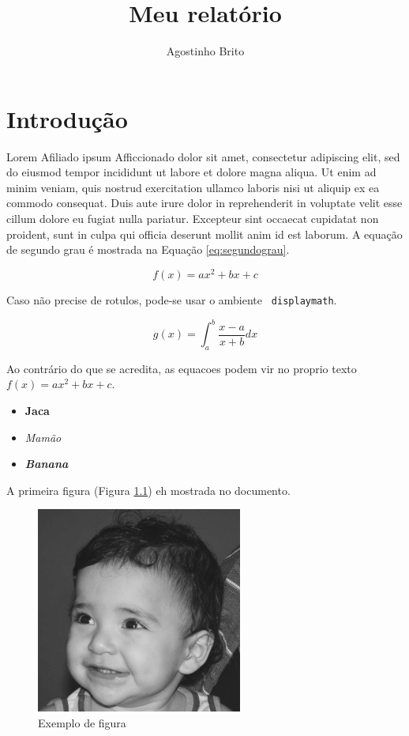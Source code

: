 \documentclass[a4, 12pt]{report}
\begin{document}
\title{Meu relatório}
\author{Agostinho Brito}

\maketitle

\tableofcontents

\chapter{Introdução}
\label{cha:introducao}

Lorem Afiliado ipsum Afficcionado dolor sit amet, consectetur
adipiscing elit, sed do eiusmod tempor incididunt ut labore et dolore
magna aliqua. Ut enim ad minim veniam, quis nostrud exercitation
ullamco laboris nisi ut aliquip ex ea commodo consequat. Duis aute
irure dolor in reprehenderit in voluptate velit esse cillum dolore eu
fugiat nulla pariatur. Excepteur sint occaecat cupidatat non proident,
sunt in culpa qui officia deserunt mollit anim id est laborum. A
equação de segundo grau é mostrada na Equação \ref{eq:segundograu}.

\begin{equation}
  \label{eq:segundograu}
  f(x) = a x^2+bx+c
\end{equation}

Caso não precise de rotulos, pode-se usar o ambiente {\tt
  displaymath}.

\begin{displaymath}
  g(x) = \int_a^b \frac{x-a}{x+b} dx
\end{displaymath}

Ao contrário do que se acredita, as equacoes podem vir no proprio
texto $f(x) = a x^2+bx+c$.

\begin{itemize}
\item {\bf Jaca}
\item {\it Mamão}
\item \textbf{\textit{Banana}}
\end{itemize}

A primeira figura (Figura \ref{fig:exemplo}) eh mostrada no documento.

\begin{figure}[htb]
  \centering
  \includegraphics[width=0.5\linewidth]{biel.png}
  \caption{Exemplo de figura}
  \label{fig:exemplo}
\end{figure}
\end{document}
